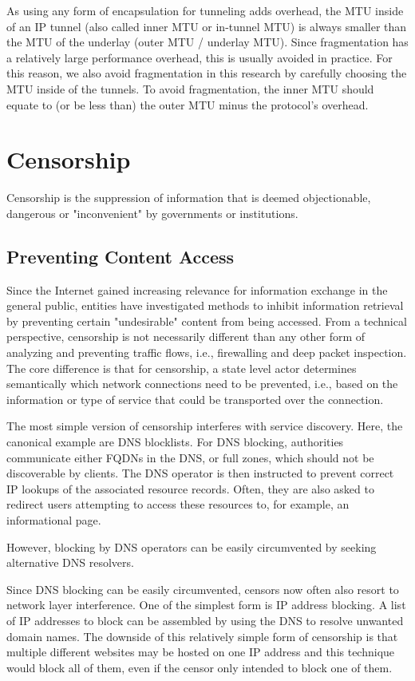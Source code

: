 As using any form of encapsulation for tunneling adds overhead, the MTU inside of an IP tunnel (also called inner MTU or in-tunnel MTU) is always smaller than the MTU of the underlay (outer MTU / underlay MTU).
Since fragmentation has a relatively large performance overhead, this is usually avoided in practice.
For this reason, we also avoid fragmentation in this research by carefully choosing the MTU inside of the tunnels.
To avoid fragmentation, the inner MTU should equate to (or be less than) the outer MTU minus the protocol's overhead.


\section{Censorship}
Censorship \cite{wiki:Censorship} is the suppression of information that is deemed objectionable, dangerous or "inconvenient" by governments or institutions.

\subsection{Preventing Content Access}
Since the Internet gained increasing relevance for information exchange in the general public, entities have investigated methods to inhibit information retrieval \cite{Internet_censorship} by preventing certain "undesirable" content from being accessed.
From a technical perspective, censorship is not necessarily different than any other form of analyzing and preventing traffic flows, i.e., firewalling and deep packet inspection.
The core difference is that for censorship, a state level actor determines semantically which network connections need to be prevented, i.e., based on the information or type of service that could be transported over the connection.

The most simple version of censorship interferes with service discovery.
Here, the canonical example are DNS blocklists.
For DNS blocking, authorities communicate either FQDNs in the DNS, or full zones, which should not be discoverable by clients.
The DNS operator is then instructed to prevent correct IP lookups of the associated resource records.
Often, they are also asked to redirect users attempting to access these resources to, for example, an informational page.

However, blocking by DNS operators can be easily circumvented by seeking alternative DNS resolvers.

Since DNS blocking can be easily circumvented, censors now often also resort to network layer interference.
One of the simplest form is IP address blocking.
A list of IP addresses to block can be assembled by using the DNS to resolve unwanted domain names.
The downside of this relatively simple form of censorship is that multiple different websites may be hosted on one IP address and this technique would block all of them, even if the censor only intended to block one of them.

